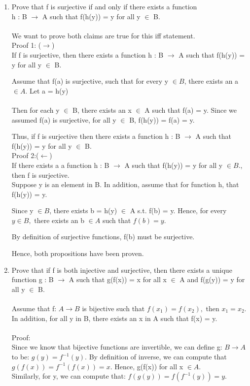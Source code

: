 \documentclass[12pt]{article}
\begin{document}
\begin{enumerate}
\begin{enumerate}[label=(\Alph*)]
            \item Prove that f is surjective if and only if there exists a function \\h : B $\rightarrow$ A such that f(h(y)) = y for all y $\in$ B. \\
            \\
            We want to prove both claims are true for this iff statement.\\
            Proof 1: ($\rightarrow$) \\
            If f is surjective, then there exists a function h : B $\rightarrow$ A such that f(h(y)) = y for all y $\in$ B. 

            Assume that f(a) is surjective, such that for every y $\in B$, there exists an a $\in A$. Let a = h(y)\\ 
            \\
            Then for each y $\in$ B, there exists an x $\in$ A such that f(a) = y. 
            Since we assumed f(a) is surjective, for all y $\in$ B, f(h(y)) = f(a) = y.

            Thus, if f is surjective then there exists a function h : B $\rightarrow$ A such that f(h(y)) = y for all y $\in$ B. \\

            Proof 2:($\leftarrow$) \\
            If there exists a a function h : B $\rightarrow$ A such that f(h(y)) = y for all y $\in B.$, then f is surjective. \\
            Suppose y is an element in B. In addition, assume that for function h, that f(h(y)) = y.

            Since y $\in B$, there exists b = h(y) $\in$ A s.t. f(b) = y. Hence, for every $y \in B,$ there exists an b $\in A$ such that $f(b) = y$. 

            By definition of surjective functions, f(b) must be surjective.

            Hence, both propositions have been proven. \qedsymbol{}
            \\
            
            \item Prove that if f is both injective and surjective, then there exists a unique function g : B $\rightarrow$ A such that g(f(x)) = x for all x $\in$ A and f(g(y)) = y for all y $\in$ B. \\ \\
            Assume that f: $A \rightarrow B$ is bijective such that $f(x_1) = f(x_2),$ then $x_1 = x_2$. In addition, for all y in B, there exists an x in A such that f(x) = y.\\
            \\
            Proof: \\ 
            Since we know that bijective functions are invertible, we can define g: $B \rightarrow A$ to be: $g(y) = f^{-1}(y)$. By definition of inverse, we can compute that 
            $g(f(x)) = f^{-1}(f(x)) = x$. Hence, g(f(x)) for all x $\in A$.
            \\
            Similarly, for y, we can compute that:
            $f(g(y)) = f(f^{-1}(y)) = y$. 


\end{enumerate}
\end{enumerate}
\end{document}
